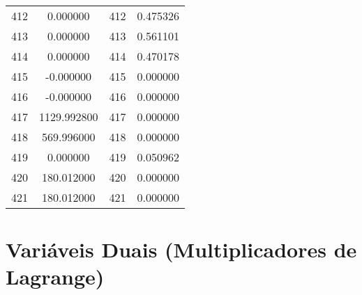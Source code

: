 \documentclass[12pt]{article}
\begin{document}
\begin{longtable}{@{}cccc@{}}
412 & 0.000000 & 412 & 0.475326 \\
413 & 0.000000 & 413 & 0.561101 \\
414 & 0.000000 & 414 & 0.470178 \\
415 & -0.000000 & 415 & 0.000000 \\
416 & -0.000000 & 416 & 0.000000 \\
417 & 1129.992800 & 417 & 0.000000 \\
418 & 569.996000 & 418 & 0.000000 \\
419 & 0.000000 & 419 & 0.050962 \\
420 & 180.012000 & 420 & 0.000000 \\
421 & 180.012000 & 421 & 0.000000 \\

\end{longtable}

\section{Variáveis Duais (Multiplicadores de Lagrange)}
\end{document}
